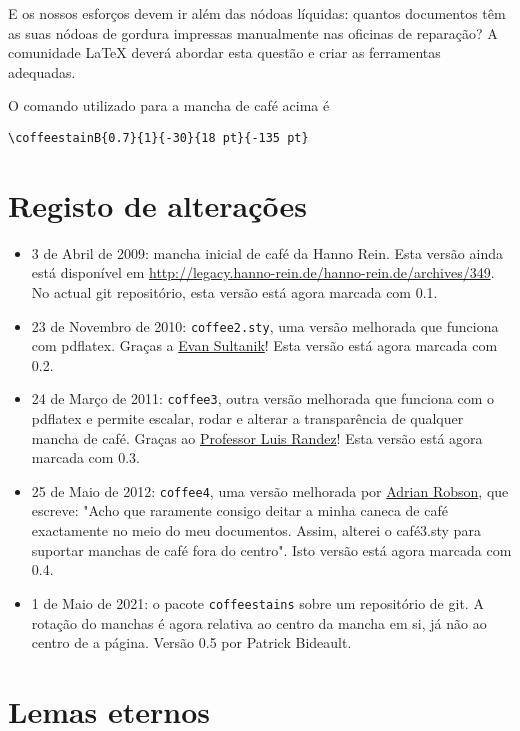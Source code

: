 \documentclass[a4paper, 11pt, BCOR = 0 pt, oneside]{scrartcl}
\begin{document}
E os nossos esforços devem ir além das nódoas líquidas: quantos documentos têm
as suas nódoas de gordura impressas manualmente nas oficinas de reparação?
A comunidade \LaTeX{} deverá abordar esta questão e criar as ferramentas
adequadas.

\vfill{}

\begin{tcolorbox}
O comando utilizado para a mancha de café acima é

  \verb|\coffeestainB{0.7}{1}{-30}{18 pt}{-135 pt}|
\end{tcolorbox}
\newpage{}
\section{Registo de alterações}
\begin{itemize}
\item 3 de Abril de 2009: mancha inicial de café da Hanno Rein. Esta versão
  ainda está disponível em
  \url{http://legacy.hanno-rein.de/hanno-rein.de/archives/349}. No actual git
  repositório, esta versão está agora marcada com 0.1.
\item 23 de Novembro de 2010: \texttt{coffee2.sty}, uma versão melhorada que
  funciona com pdflatex.  Graças a \href{http://www.sultanik.com/}{Evan
    Sultanik}! Esta versão está agora marcada com 0.2.
\item 24 de Março de 2011: \texttt{coffee3}, outra versão melhorada que funciona com o pdflatex
e permite escalar, rodar e alterar a transparência de qualquer mancha de café.
Graças ao \href{http://pcmap.unizar.es/~pilar/}{Professor Luis
    Randez}! Esta versão está agora marcada com 0.3.
\item 25 de Maio de 2012: \texttt{coffee4}, uma versão melhorada por
  \href{http://nepsweb.co.uk/homeapr/}{Adrian Robson}, que escreve: "Acho que
  raramente consigo deitar a minha caneca de café exactamente no meio do meu
  documentos. Assim, alterei o café3.sty para suportar manchas de café fora do
  centro". Isto versão está agora marcada com 0.4.
\item 1 de Maio de 2021: o pacote \texttt{coffeestains} sobre um repositório de
  git. A rotação do manchas é agora relativa ao centro da mancha em si, já não
  ao centro de a página. Versão 0.5 por Patrick Bideault.
\end{itemize}
\label{stainC}

\section{Lemas eternos}
\end{document}

